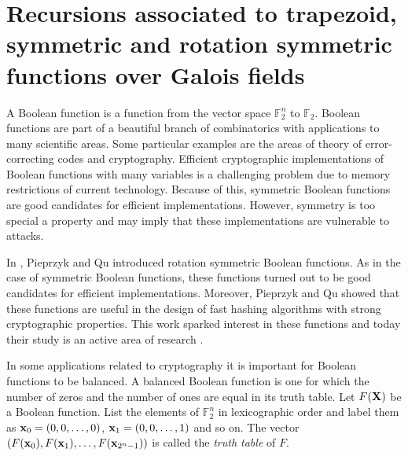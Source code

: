 \chapter
{Recursions associated to trapezoid, symmetric and rotation symmetric functions over Galois fields }  %




A Boolean function is a function from the vector space $\mathbb{F}_2^n$ to  $\mathbb{F}_2$.  Boolean functions are part of a beautiful branch of combinatorics with applications to many scientific areas.  
Some particular examples are the areas of theory of error-correcting codes and cryptography.   Efficient cryptographic implementations of Boolean functions with many variables is a challenging problem due to memory 
restrictions of current technology. Because of this, symmetric Boolean functions are good candidates for efficient implementations. However, symmetry is too special a property and may imply that these 
implementations are vulnerable to attacks.

In \cite{piequ}, Pieprzyk and Qu introduced rotation symmetric Boolean functions.  As in the case of symmetric Boolean functions, these functions turned out to be good candidates for efficient implementations.  Moreover, Pieprzyk and Qu showed that these functions are useful in the design of fast hashing algorithms with strong cryptographic properties.  This work sparked interest in these functions and today their study is an active area of research \cite{BCP,cusickjohns, cusickstanica, dalaimaitrasarkar, hell, maxhellmaitra, stanicamaitra, stanicamaitraclark}.

In some applications related to cryptography it is important for Boolean functions to be balanced.  A balanced Boolean function is one for which the number of zeros and the number 
of ones are equal in its truth table.  Let $F({\bf X})$ be a Boolean function.  List the elements of $\mathbb{F}_2^ n$ in lexicographic order and label them as 
${\bf x}_0=(0,0,\ldots, 0)$, ${\bf x}_{1}=(0,0,\ldots, 1)$ and so on.  The vector $(F({\bf x}_0),F({\bf x}_1),\ldots, F({\bf x}_{2^n-1}))$ is called the {\it truth table} of $F$.    

